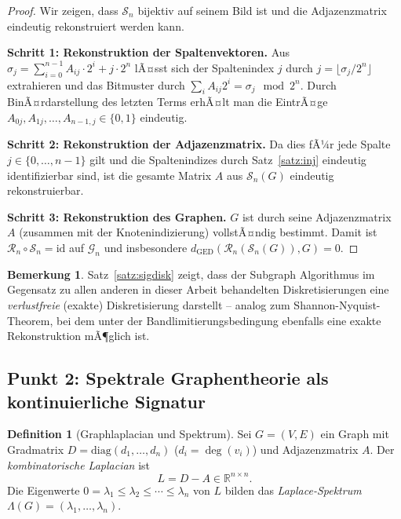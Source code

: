 ﻿\documentclass[a4paper,12pt]{article}
\theoremstyle{definition}
\newtheorem{definition}{Definition}
\newtheorem{bemerkung}{Bemerkung}
\begin{document}
\begin{proof}
    Wir zeigen, dass $\mathcal{S}_n$ bijektiv auf seinem Bild ist und die Adjazenzmatrix
    eindeutig rekonstruiert werden kann.

    \textbf{Schritt 1: Rekonstruktion der Spaltenvektoren.}
    Aus $\sigma_j = \sum_{i=0}^{n-1} A_{ij} \cdot 2^i + j \cdot 2^n$ lÃ¤sst sich
    der Spaltenindex $j$ durch $j = \lfloor \sigma_j / 2^n \rfloor$ extrahieren und
    das Bitmuster durch $\sum_{i} A_{ij} 2^i = \sigma_j \mod 2^n$.
    Durch BinÃ¤rdarstellung des letzten Terms erhÃ¤lt man die EintrÃ¤ge
    $A_{0j}, A_{1j}, \ldots, A_{n-1,j} \in \{0,1\}$ eindeutig.

    \textbf{Schritt 2: Rekonstruktion der Adjazenzmatrix.}
    Da dies fÃ¼r jede Spalte $j \in \{0,\ldots,n-1\}$ gilt und die Spaltenindizes durch
    Satz~\ref{satz:inj} eindeutig identifizierbar sind, ist die gesamte Matrix $A$ aus
    $\mathcal{S}_n(G)$ eindeutig rekonstruierbar.

    \textbf{Schritt 3: Rekonstruktion des Graphen.}
    $G$ ist durch seine Adjazenzmatrix $A$ (zusammen mit der Knotenindizierung) vollstÃ¤ndig
    bestimmt. Damit ist $\mathcal{R}_n \circ \mathcal{S}_n = \mathrm{id}$ auf $\mathcal{G}_n$
    und insbesondere $d_{\mathrm{GED}}(\mathcal{R}_n(\mathcal{S}_n(G)), G) = 0$. \qedhere
\end{proof}

\begin{bemerkung}
    Satz~\ref{satz:sigdisk} zeigt, dass der Subgraph Algorithmus im Gegensatz zu allen anderen
    in dieser Arbeit behandelten Diskretisierungen eine \emph{verlustfreie} (exakte)
    Diskretisierung darstellt -- analog zum Shannon-Nyquist-Theorem, bei dem unter der
    Bandlimitierungsbedingung ebenfalls eine exakte Rekonstruktion mÃ¶glich ist.
\end{bemerkung}

\subsection{Punkt 2: Spektrale Graphentheorie als kontinuierliche Signatur}

\begin{definition}[Graphlaplacian und Spektrum]
    Sei $G = (V,E)$ ein Graph mit Gradmatrix $D = \mathrm{diag}(d_1,\ldots,d_n)$
    ($d_i = \deg(v_i)$) und Adjazenzmatrix $A$. Der \emph{kombinatorische Laplacian} ist
    \[
    L = D - A \in \mathbb{R}^{n \times n}.
    \]
    Die Eigenwerte $0 = \lambda_1 \leq \lambda_2 \leq \cdots \leq \lambda_n$ von $L$ bilden
    das \emph{Laplace-Spektrum} $\Lambda(G) = (\lambda_1, \ldots, \lambda_n)$.
\end{definition}
\end{document}
